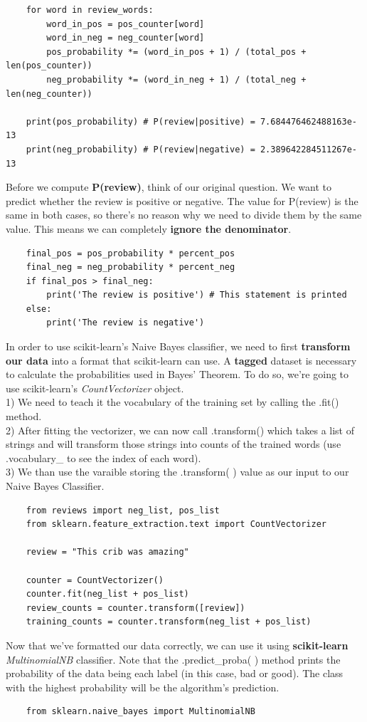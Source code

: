 \documentclass[11pt, a4paper]{article}
\begin{document}
\begin{spacing}{1.1}
\begin{lstlisting}
	for word in review_words:
		word_in_pos = pos_counter[word]
		word_in_neg = neg_counter[word]
		pos_probability *= (word_in_pos + 1) / (total_pos + len(pos_counter))
		neg_probability *= (word_in_neg + 1) / (total_neg + len(neg_counter))
	
	print(pos_probability) # P(review|positive) = 7.684476462488163e-13
	print(neg_probability) # P(review|negative) = 2.389642284511267e-13	\end{lstlisting} \vspace*{1mm}
	Before we compute \textbf{P(review)}, think of our original question. We want to predict whether the review is positive or negative. The value for P(review) is the same in both cases, so there’s no reason why we need to divide them by the same value. This means we can completely \textbf{ignore the denominator}. 
	\begin{lstlisting}
	final_pos = pos_probability * percent_pos
	final_neg = neg_probability * percent_neg
	if final_pos > final_neg:
		print('The review is positive') # This statement is printed
	else:
		print('The review is negative')	\end{lstlisting} \newpage
	
	\noindent  In order to use scikit-learn’s Naive Bayes classifier, we need to first \textbf{transform our data} into a format that scikit-learn can use. A \textbf{tagged} dataset is necessary to calculate the probabilities used in Bayes’ Theorem. To do so, we’re going to use scikit-learn’s \textit{CountVectorizer} object. \\
	1) We need to teach it the vocabulary of the training set by calling the .fit() method. \\
	2) After fitting the vectorizer, we can now call .transform() which takes a list of strings and will transform \hspace*{3mm} those strings into counts of the trained words (use .vocabulary\_ to see the index of each word). \\
	3) We than use the varaible storing the .transform( ) value as our input to our Naive Bayes Classifier. 
	\begin{lstlisting}
	from reviews import neg_list, pos_list
	from sklearn.feature_extraction.text import CountVectorizer
	
	review = "This crib was amazing"
	
	counter = CountVectorizer()
	counter.fit(neg_list + pos_list)
	review_counts = counter.transform([review])
	training_counts = counter.transform(neg_list + pos_list)\end{lstlisting} \vspace*{1mm}
	Now that we’ve formatted our data correctly, we can use it using \textbf{scikit-learn} \textit{MultinomialNB} classifier. Note that the .predict\_proba( ) method prints the probability of the data being each label (in this case, bad or good). The class with the highest probability will be the algorithm’s prediction.
	\begin{lstlisting}
	from sklearn.naive_bayes import MultinomialNB
	

\end{lstlisting}
\end{spacing}
\end{document}
